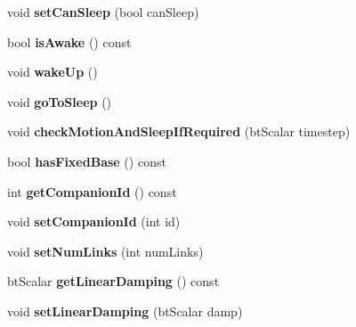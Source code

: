 \begin{DoxyCompactItemize}
\item 
\mbox{\label{classbtMultiBody_a2659acc78021df7907f0ac75e4e9ea61}} 
void {\bfseries set\+Can\+Sleep} (bool can\+Sleep)
\item 
\mbox{\label{classbtMultiBody_a15433657756131aef4055dcd7618ea1e}} 
bool {\bfseries is\+Awake} () const
\item 
\mbox{\label{classbtMultiBody_a2cf38777cf487eafb13cdd5b56a0f530}} 
void {\bfseries wake\+Up} ()
\item 
\mbox{\label{classbtMultiBody_adc438609bb0c384950cfba1ee720200b}} 
void {\bfseries go\+To\+Sleep} ()
\item 
\mbox{\label{classbtMultiBody_a6fda2785db8302ce2e487cf55aff23d5}} 
void {\bfseries check\+Motion\+And\+Sleep\+If\+Required} (bt\+Scalar timestep)
\item 
\mbox{\label{classbtMultiBody_a9bb5d0e983f409d92cbe18238621a50a}} 
bool {\bfseries has\+Fixed\+Base} () const
\item 
\mbox{\label{classbtMultiBody_a2c614edf28ebaa080560f1e8061d3b79}} 
int {\bfseries get\+Companion\+Id} () const
\item 
\mbox{\label{classbtMultiBody_aec0ff1d617e7d31344ad4f4c83e808e7}} 
void {\bfseries set\+Companion\+Id} (int id)
\item 
\mbox{\label{classbtMultiBody_ab2b5bc6f3953c9768bb6caa0aba43e63}} 
void {\bfseries set\+Num\+Links} (int num\+Links)
\item 
\mbox{\label{classbtMultiBody_abde7f2e9e334ba27c207e9341e2ea064}} 
bt\+Scalar {\bfseries get\+Linear\+Damping} () const
\item 
\mbox{\label{classbtMultiBody_a51e85f96027e3b2d6a7c87d60b3c7660}} 
void {\bfseries set\+Linear\+Damping} (bt\+Scalar damp)
\item 
\mbox{\label{classbtMultiBody_a2ccb51f59b0ffdc6b28cfcae2adb938b}} 

\end{DoxyCompactItemize}
